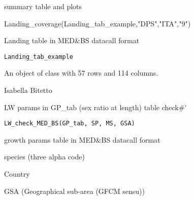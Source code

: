 \documentclass[a4paper]{book}
\begin{document}
%
\begin{Value}
summary table and plots
\end{Value}
%
\begin{Examples}
\begin{ExampleCode}
Landing_coverage(Landing_tab_example,"DPS","ITA","9")
\end{ExampleCode}
\end{Examples}
%
\begin{Description}\relax
Landing table in MED\&BS datacall format
\end{Description}
%
\begin{Usage}
\begin{verbatim}
Landing_tab_example
\end{verbatim}
\end{Usage}
%
\begin{Format}
An object of class  with 57 rows and 114 columns.
\end{Format}
%
\begin{Author}\relax
Isabella Bitetto 
\end{Author}
%
\begin{Description}\relax
LW params in GP\_tab (sex ratio at length) table check\#'
\end{Description}
%
\begin{Usage}
\begin{verbatim}
LW_check_MED_BS(GP_tab, SP, MS, GSA)
\end{verbatim}
\end{Usage}
%
\begin{Arguments}
\begin{ldescription}
\item[\code{GP\_tab}] growth params table in MED\&BS datacall format

\item[\code{SP}] species (three alpha code)

\item[\code{MS}] Country

\item[\code{GSA}] GSA (Geographical sub-area (GFCM sensu))
\end{ldescription}
\end{Arguments}
\end{document}

